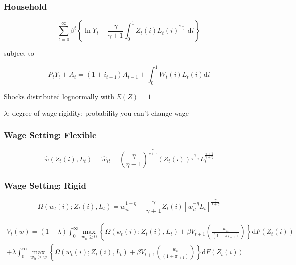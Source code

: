 \documentclass{beamer}
\begin{document}
\begin{frame}[t]\frametitle{Household}

    \begin{equation*} \label{eq:utility}
        \sum_{t=0}^{\infty} \beta^t \left\{\ln Y_t - \frac{\gamma}{\gamma + 1} \int_{0}^{1} Z_t(i)L_t(i)^{\frac{\gamma + 1}{\gamma}}\mathup{d}i\right\}
    \end{equation*}

    subject to

    \begin{equation*}
        \label{eq:budget}
        P_t Y_t + A_t = \left(1 + i_{t-1}\right)A_{t-1} + \int_{0}^{1}\! W_t(i)L_t(i)\mathup{d}i
    \end{equation*}

Shocks distributed lognormally with $E(Z) = 1$

$\lambda$: degree of wage rigidity; probability you can't change wage

\end{frame}


\begin{frame}[t]\frametitle{Wage Setting: Flexible}

    \begin{equation*}
        \label{eq:flex}
        \hat{w}(Z_t(i); L_t) = \hat{w}_{it} = \left( \frac{\eta}{\eta - 1} \right)^{\frac{\gamma}{\eta + \gamma}}\left( Z_t(i) \right)^{\frac{\gamma}{\eta + \gamma}} L_t^{\frac{\gamma + 1}{\gamma + \eta}}
    \end{equation*}


\end{frame}



\begin{frame}[t]\frametitle{Wage Setting: Rigid}
\fontsize{9pt}{12}\selectfont

    \begin{equation*}
        \label{eq:labor_part}
        \Omega( w_t(i); Z_t(i), L_t ) = w_{it}^{1 - \eta} - \frac{\gamma}{\gamma + 1}Z_t(i)\left[ w_{it}^{-\eta}L_t \right]^{\frac{\gamma}{1 + \gamma}}
    \end{equation*}


    \begin{multline*}
        \label{eq:value_function}
        V_t(w) = (1 - \lambda) \int_{0}^{\infty} \max_{w_{it} \geq 0} \left\{ \Omega( w_t(i); Z_t(i), L_t ) + \beta V_{t+1}\left( \frac{w_{it}}{(1 + \pi_{t+1})} \right) \right\} \mathup{d}F(Z_t(i)) \\
                    + \lambda  \int_{0}^{\infty} \max_{w_{it} \geq w} \left\{ \Omega( w_t(i); Z_t(i), L_t ) + \beta V_{t+1}\left( \frac{w_{it}}{(1 + \pi_{t+1})} \right) \right\} \mathup{d}F(Z_t(i))
    \end{multline*}


\end{frame}
\end{document}
